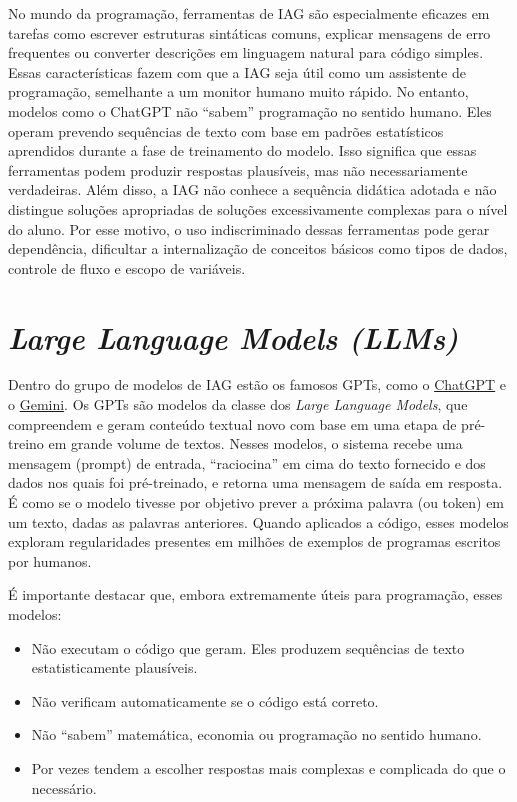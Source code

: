 \documentclass[
  brazilian,
  letterpaper,
  DIV=11,
  numbers=noendperiod]{scrreprt}
\providecommand{\tightlist}{%
  \setlength{\itemsep}{0pt}\setlength{\parskip}{0pt}}
\begin{document}
No mundo da programação, ferramentas de IAG são especialmente eficazes
em tarefas como escrever estruturas sintáticas comuns, explicar
mensagens de erro frequentes ou converter descrições em linguagem
natural para código simples. Essas características fazem com que a IAG
seja útil como um assistente de programação, semelhante a um monitor
humano muito rápido. No entanto, modelos como o ChatGPT não ``sabem''
programação no sentido humano. Eles operam prevendo sequências de texto
com base em padrões estatísticos aprendidos durante a fase de
treinamento do modelo. Isso significa que essas ferramentas podem
produzir respostas plausíveis, mas não necessariamente verdadeiras. Além
disso, a IAG não conhece a sequência didática adotada e não distingue
soluções apropriadas de soluções excessivamente complexas para o nível
do aluno. Por esse motivo, o uso indiscriminado dessas ferramentas pode
gerar dependência, dificultar a internalização de conceitos básicos como
tipos de dados, controle de fluxo e escopo de variáveis.

\section{\texorpdfstring{\emph{Large Language Models
(LLMs)}}{Large Language Models (LLMs)}}\label{large-language-models-llms}

Dentro do grupo de modelos de IAG estão os famosos GPTs, como o
\href{https://chatgpt.com/}{ChatGPT} e o
\href{https://gemini.google.com/}{Gemini}. Os GPTs são modelos da classe
dos \emph{Large Language Models}, que compreendem e geram conteúdo
textual novo com base em uma etapa de pré-treino em grande volume de
textos. Nesses modelos, o sistema recebe uma mensagem (prompt) de
entrada, ``raciocina'' em cima do texto fornecido e dos dados nos quais
foi pré-treinado, e retorna uma mensagem de saída em resposta. É como se
o modelo tivesse por objetivo prever a próxima palavra (ou token) em um
texto, dadas as palavras anteriores. Quando aplicados a código, esses
modelos exploram regularidades presentes em milhões de exemplos de
programas escritos por humanos.

É importante destacar que, embora extremamente úteis para programação,
esses modelos:

\begin{itemize}
\tightlist
\item
  Não executam o código que geram. Eles produzem sequências de texto
  estatisticamente plausíveis.
\item
  Não verificam automaticamente se o código está correto.
\item
  Não ``sabem'' matemática, economia ou programação no sentido humano.
\item
  Por vezes tendem a escolher respostas mais complexas e complicada do
  que o necessário.
\end{itemize}
\end{document}
